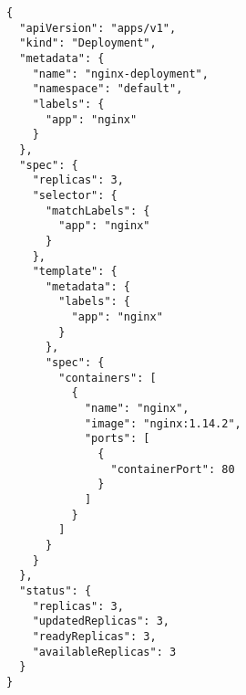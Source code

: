 \begin{verbatim}
{
  "apiVersion": "apps/v1",
  "kind": "Deployment",
  "metadata": {
    "name": "nginx-deployment",
    "namespace": "default",
    "labels": {
      "app": "nginx"
    }
  },
  "spec": {
    "replicas": 3,
    "selector": {
      "matchLabels": {
        "app": "nginx"
      }
    },
    "template": {
      "metadata": {
        "labels": {
          "app": "nginx"
        }
      },
      "spec": {
        "containers": [
          {
            "name": "nginx",
            "image": "nginx:1.14.2",
            "ports": [
              {
                "containerPort": 80
              }
            ]
          }
        ]
      }
    }
  },
  "status": {
    "replicas": 3,
    "updatedReplicas": 3,
    "readyReplicas": 3,
    "availableReplicas": 3
  }
}
\end{verbatim}
